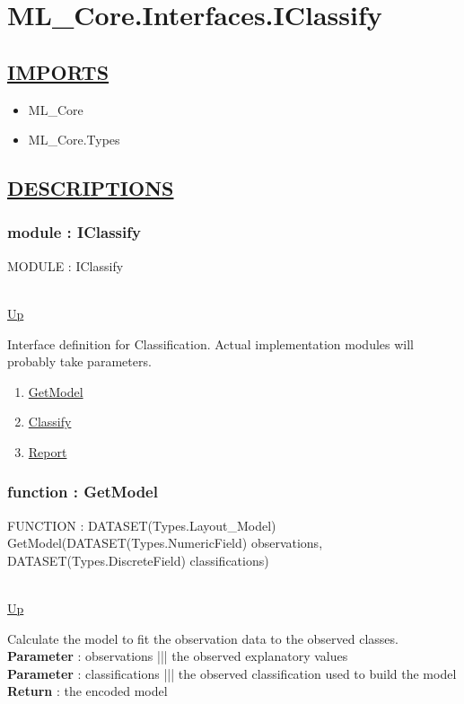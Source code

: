 \chapter*{ML\_Core.Interfaces.IClassify}
\hypertarget{ML_Core.Interfaces.IClassify}{}

\section*{\underline{IMPORTS}}
\begin{itemize}
\item ML\_Core
\item ML\_Core.Types
\end{itemize}

\section*{\underline{DESCRIPTIONS}}
\subsection*{module : IClassify}
\hypertarget{ecldoc:ML_Core.Interfaces.IClassify}{MODULE : IClassify} \\
\hyperlink{ecldoc:}{Up} \\
\par
Interface definition for Classification. Actual implementation modules will probably take parameters. \\
\begin{enumerate}
\item \hyperlink{ecldoc:ml_core.interfaces.iclassify.getmodel}{GetModel}
\item \hyperlink{ecldoc:ml_core.interfaces.iclassify.classify}{Classify}
\item \hyperlink{ecldoc:ml_core.interfaces.iclassify.report}{Report}
\end{enumerate}
\subsection*{function : GetModel}
\hypertarget{ecldoc:ml_core.interfaces.iclassify.getmodel}{FUNCTION : DATASET(Types.Layout\_Model) GetModel(DATASET(Types.NumericField) observations, DATASET(Types.DiscreteField) classifications)} \\
\hyperlink{ecldoc:ML_Core.Interfaces.IClassify}{Up} \\
\par
Calculate the model to fit the observation data to the observed classes. \\
\textbf{Parameter} : observations ||| the observed explanatory values \\
\textbf{Parameter} : classifications ||| the observed classification used to build the model \\
\textbf{Return} : the encoded model \\
